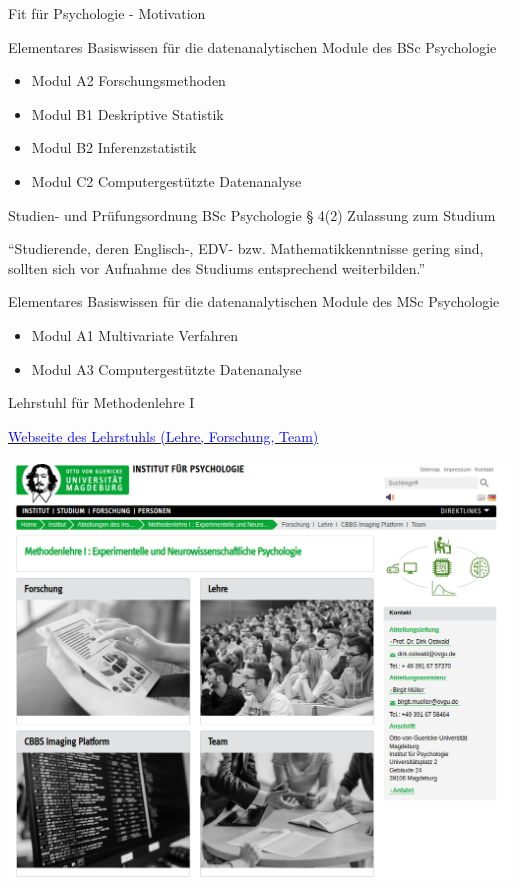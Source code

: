 \documentclass[
  8pt,
  ignorenonframetext,
  t]{beamer}
\providecommand{\tightlist}{%
  \setlength{\itemsep}{0pt}\setlength{\parskip}{0pt}}
\begin{document}
\begin{frame}{Fit für Psychologie - Motivation}
\protect\hypertarget{fit-fuxfcr-psychologie---motivation}{}

Elementares Basiswissen für die datenanalytischen Module des BSc
Psychologie

\small

\begin{itemize}
\tightlist
\item
  Modul A2 Forschungsmethoden
\item
  Modul B1 Deskriptive Statistik
\item
  Modul B2 Inferenzstatistik
\item
  Modul C2 Computergestützte Datenanalyse
\end{itemize}

\normalsize

Studien- und Prüfungsordnung BSc Psychologie § 4(2) Zulassung zum
Studium

\small

``Studierende, deren Englisch-, EDV- bzw. Mathematikkenntnisse gering
sind, sollten sich vor Aufnahme des Studiums entsprechend
weiterbilden.''

\normalsize

Elementares Basiswissen für die datenanalytischen Module des MSc
Psychologie

\small

\begin{itemize}
\tightlist
\item
  Modul A1 Multivariate Verfahren
\item
  Modul A3 Computergestützte Datenanalyse
\end{itemize}
\end{frame}

\begin{frame}{Lehrstuhl für Methodenlehre I}
\protect\hypertarget{lehrstuhl-fuxfcr-methodenlehre-i}{}

\href{https://www.ipsy.ovgu.de/methodenlehre_I-path-980,1404.html}{\textcolor{blue}{Webseite des Lehrstuhls (Lehre, Forschung, Team)}}

\vspace{3mm}

\begin{center}\includegraphics[width=0.7\linewidth]{../Abbildungen/Lehrstuhlseite} \end{center}

\color{red}{TODO}
\end{frame}
\end{document}
